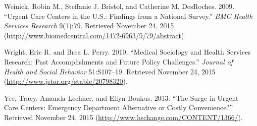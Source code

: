 \documentclass[12pt,twoside]{reedthesis}
\begin{document}
  Weinick, Robin M., Steffanie J. Bristol, and Catherine M. DesRoches.
  2009. ``Urgent Care Centers in the U.S.: Findings from a National
  Survey.'' \emph{BMC Health Services Research} 9(1):79. Retrieved
  November 24, 2015
  (\url{http://www.biomedcentral.com/1472-6963/9/79/abstract}).
  
  Wright, Eric R. and Brea L. Perry. 2010. ``Medical Sociology and Health
  Services Research: Past Accomplishments and Future Policy Challenges.''
  \emph{Journal of Health and Social Behavior} 51:S107--19. Retrieved
  November 24, 2015 (\url{http://www.jstor.org/stable/20798320}).
  
  Yee, Tracy, Amanda Lechner, and Ellyn Boukus. 2013. ``The Surge in
  Urgent Care Centers: Emergency Department Alternative or Costly
  Convenience?'' Retrieved November 24, 2015
  (\url{http://www.hschange.com/CONTENT/1366/}).


\end{document}

